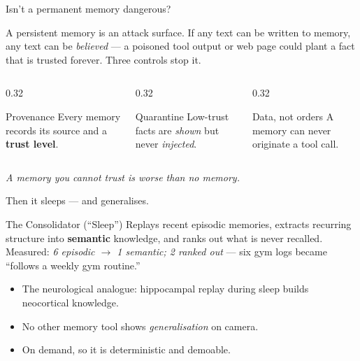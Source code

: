\documentclass[aspectratio=169,10pt]{beamer}
\begin{document}
\begin{frame}{Isn't a permanent memory dangerous?}
  \begin{block}{A persistent memory is an attack surface.}
    If any text can be written to memory, any text can be \emph{believed} --- a poisoned tool output or
    web page could plant a fact that is trusted forever. Three controls stop it.
  \end{block}
  \begin{columns}
    \begin{column}{0.32\textwidth}
      \begin{block}{Provenance}
        Every memory records its source and a \textbf{trust level}.
      \end{block}
    \end{column}
    \begin{column}{0.32\textwidth}
      \begin{alertblock}{Quarantine}
        Low-trust facts are \emph{shown} but never \emph{injected}.
      \end{alertblock}
    \end{column}
    \begin{column}{0.32\textwidth}
      \begin{block}{Data, not orders}
        A memory can never originate a tool call.
      \end{block}
    \end{column}
  \end{columns}
  \vfill
  \centering\itshape A memory you cannot trust is worse than no memory.
\end{frame}

\begin{frame}{Then it sleeps --- and generalises.}
  \begin{block}{The Consolidator (``Sleep'')}
    Replays recent episodic memories, extracts recurring structure into \textbf{semantic} knowledge, and
    ranks out what is never recalled. Measured: \emph{6 episodic $\rightarrow$ 1 semantic;
    2 ranked out} --- six gym logs became ``follows a weekly gym routine.''
  \end{block}
  \begin{itemize}
    \item The neurological analogue: hippocampal replay during sleep builds neocortical knowledge.
    \item No other memory tool shows \emph{generalisation} on camera.
    \item On demand, so it is deterministic and demoable.
  \end{itemize}
\end{frame}
\end{document}
